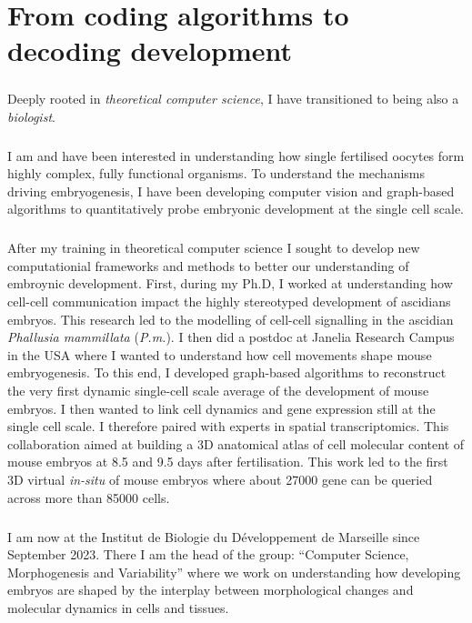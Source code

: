 \chapter{From coding algorithms to decoding development}
\chaptertoc{}
\paragraph{}Deeply rooted in \emph{theoretical computer science}, I have transitioned to being also a \emph{biologist}.

\paragraph{}I am and have been interested in understanding how single fertilised oocytes form highly complex, fully functional organisms.
To understand the mechanisms driving embryogenesis, I have been developing computer vision and graph-based algorithms to quantitatively probe embryonic development at the single cell scale.

\paragraph{}After my training in theoretical computer science I sought to develop new computationial frameworks and methods to better our understanding of embroynic development.
First, during my Ph.D, I worked at understanding how cell-cell communication impact the highly stereotyped development of ascidians embryos.
This research led to the modelling of cell-cell signalling in the ascidian \emph{Phallusia mammillata} (\emph{P.m.}).
I then did a postdoc at Janelia Research Campus in the USA where I wanted to understand how cell movements shape mouse embryogenesis.
To this end, I developed graph-based algorithms to reconstruct the very first dynamic single-cell scale average of the development of mouse embryos.
I then wanted to link cell dynamics and gene expression still at the single cell scale.
I therefore paired with experts in spatial transcriptomics.
This collaboration aimed at building a 3D anatomical atlas of cell molecular content of mouse embryos at 8.5 and 9.5 days after fertilisation.
This work led to the first 3D virtual \textit{in-situ} of mouse embryos where about 27000 gene can be queried across more than 85000 cells.

\paragraph{}I am now at the Institut de Biologie du D\'eveloppement de Marseille since September 2023.
There I am the head of the group: ``Computer Science, Morphogenesis and Variability'' where we work on understanding how developing embryos are shaped by the interplay between morphological changes and molecular dynamics in cells and tissues.


